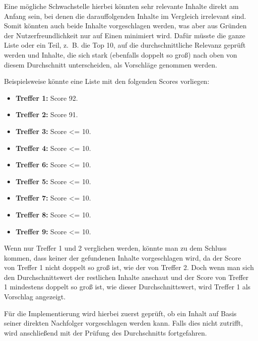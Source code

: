 Eine mögliche Schwachstelle hierbei könnten sehr relevante Inhalte direkt am Anfang sein, bei denen die darauffolgenden Inhalte im Vergleich irrelevant sind.
Somit könnten auch beide Inhalte vorgeschlagen werden, was aber aus Gründen der Nutzerfreundlichkeit nur auf Einen minimiert wird.
Dafür müsste die ganze Liste oder ein Teil, z. B. die Top 10, auf die durchschnittliche Relevanz geprüft werden und Inhalte, die sich stark (ebenfalls doppelt so groß) nach oben von diesem Durchschnitt unterscheiden, als Vorschläge genommen werden.

Beispielsweise könnte eine Liste mit den folgenden Scores vorliegen:

\begin{itemize}
  \item \textbf{Treffer 1:} Score 92.
  \item \textbf{Treffer 2:} Score 91.
  \item \textbf{Treffer 3:} Score <= 10.
  \item \textbf{Treffer 4:} Score <= 10.
  \item \textbf{Treffer 6:} Score <= 10.
  \item \textbf{Treffer 5:} Score <= 10.
  \item \textbf{Treffer 7:} Score <= 10.
  \item \textbf{Treffer 8:} Score <= 10.
  \item \textbf{Treffer 9:} Score <= 10.
\end{itemize}

Wenn nur Treffer 1 und 2 verglichen werden, könnte man zu dem Schluss kommen, dass keiner der gefundenen Inhalte vorgeschlagen wird, da der Score von Treffer 1 nicht doppelt so groß ist, wie der von Treffer 2.
Doch wenn man sich den Durchschnittswert der restlichen Inhalte anschaut und der Score von Treffer 1 mindestens doppelt so groß ist, wie dieser Durchschnittswert, wird Treffer 1 als Vorschlag angezeigt.

Für die Implementierung wird hierbei zuerst geprüft, ob ein Inhalt auf Basis seiner direkten Nachfolger vorgeschlagen werden kann. Falls dies nicht zutrifft, wird anschließend mit der Prüfung des Durchschnitts fortgefahren.
